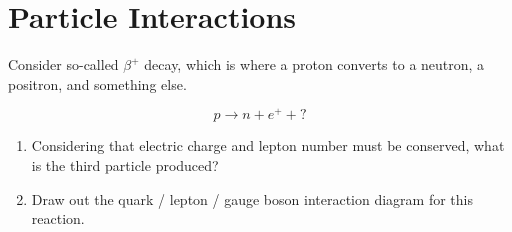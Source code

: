 \section{Particle Interactions}

\makelabheader %

\bigskip

Consider so-called $\beta^+$ decay, which is where a proton converts to a neutron, a positron, and something else. 

$$p \longrightarrow n + e^+ + ?$$

\begin{enumerate}[wide]
\item Considering that electric charge and lepton number must be conserved, what is the third particle produced?
\answerspace{1.5in}

\item Draw out the quark / lepton / gauge boson interaction diagram for this reaction.
\answerspace{2.7in}

\end{enumerate}
